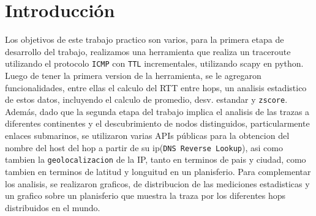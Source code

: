 \section{Introducción}
Los objetivos de este trabajo practico son varios, para la primera etapa de desarrollo del trabajo, realizamos una herramienta que realiza un traceroute utilizando el protocolo \texttt{ICMP} con \texttt{TTL} incrementales, utilizando scapy en python. Luego de tener la primera version de la herramienta, se le agregaron funcionalidades, entre ellas el calculo del RTT entre hops, un analisis estadistico de estos datos, incluyendo el calculo de promedio, desv. estandar y \texttt{zscore}. Adem\'as, dado que la segunda etapa del trabajo implica el analisis de las trazas a diferentes continentes y el descubrimiento de nodos distinguidos, particularmente enlaces submarinos, se utilizaron varias APIs p\'ublicas para la obtencion del nombre del host del hop a partir de su ip(\texttt{DNS Reverse Lookup}), asi como tambien la \texttt{geolocalizacion} de la IP, tanto en terminos de pais y ciudad, como tambien en terminos de latitud y longuitud en un planisferio. Para complementar los analisis, se realizaron graficos, de distribucion de las mediciones estadisticas y un grafico sobre un planisferio que muestra la traza por los diferentes hops distribuidos en el mundo.
